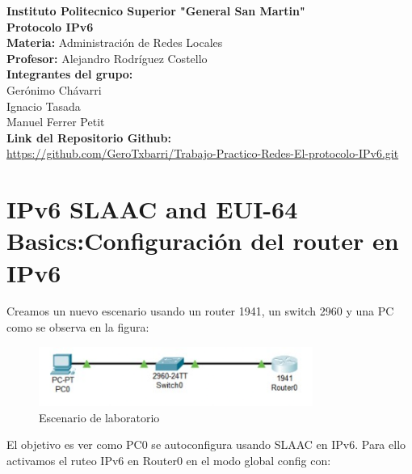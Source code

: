 \documentclass{article}
\begin{document}
\begin{titlepage}
    \centering
    {\large \textbf{Instituto Politecnico Superior "General San Martin"}}\\[1.5cm] 
    {\huge \textbf{Protocolo IPv6}}\\[1.5cm]
    
    \textbf{Materia:} Administración de Redes Locales\\[0.5cm]
    \textbf{Profesor:} Alejandro Rodríguez Costello\\[1.5cm]
    
    \textbf{Integrantes del grupo:}\\
    Gerónimo Chávarri\\
    Ignacio Tasada\\
    Manuel Ferrer Petit\\[1.5cm]
    
    \textbf{Link del Repositorio Github:}\\
    \href{https://github.com/GeroTxbarri/Trabajo-Practico-Redes-El-protocolo-IPv6.git}{https://github.com/GeroTxbarri/Trabajo-Practico-Redes-El-protocolo-IPv6.git}\\[2cm]
    
    
\end{titlepage}

\maketitle

\section{IPv6 SLAAC and EUI-64 Basics:Configuración del router en IPv6}
Creamos un nuevo escenario usando un router 1941, un switch 2960 y una PC como se observa en la figura:

\begin{figure}[h]
    \centering
    \includegraphics[width=0.8\textwidth]{img 1 coba.png}
    \caption{Escenario de laboratorio}
\end{figure}

El objetivo es ver como PC0 se autoconfigura usando SLAAC en IPv6. Para ello activamos el ruteo IPv6 en Router0 en el modo global config con:
\end{document}
